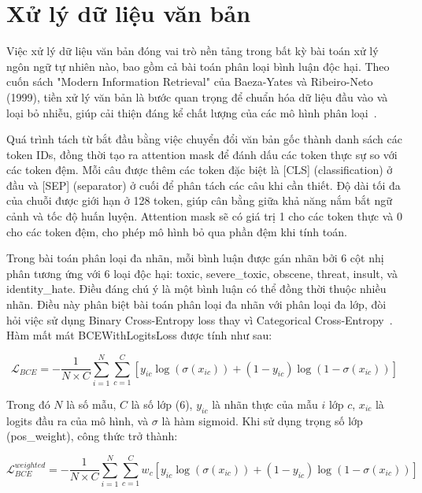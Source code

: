 \documentclass[../BTL.tex]{subfiles}
\begin{document}
\section{Xử lý dữ liệu văn bản}
Việc xử lý dữ liệu văn bản đóng vai trò nền tảng trong bất kỳ bài toán xử lý ngôn ngữ tự nhiên nào, bao gồm cả bài toán phân loại bình luận độc hại. Theo cuốn sách "Modern Information Retrieval" của Baeza-Yates và Ribeiro-Neto (1999), tiền xử lý văn bản là bước quan trọng để chuẩn hóa dữ liệu đầu vào và loại bỏ nhiễu, giúp cải thiện đáng kể chất lượng của các mô hình phân loại~\cite{baeza-yates1999modern}.

Quá trình tách từ bắt đầu bằng việc chuyển đổi văn bản gốc thành danh sách các token IDs, đồng thời tạo ra attention mask để đánh dấu các token thực sự so với các token đệm. Mỗi câu được thêm các token đặc biệt là [CLS] (classification) ở đầu và [SEP] (separator) ở cuối để phân tách các câu khi cần thiết. Độ dài tối đa của chuỗi được giới hạn ở 128 token, giúp cân bằng giữa khả năng nắm bắt ngữ cảnh và tốc độ huấn luyện. Attention mask sẽ có giá trị 1 cho các token thực và 0 cho các token đệm, cho phép mô hình bỏ qua phần đệm khi tính toán.

Trong bài toán phân loại đa nhãn, mỗi bình luận được gán nhãn bởi 6 cột nhị phân tương ứng với 6 loại độc hại: toxic, severe\_toxic, obscene, threat, insult, và identity\_hate. Điều đáng chú ý là một bình luận có thể đồng thời thuộc nhiều nhãn. Điều này phân biệt bài toán phân loại đa nhãn với phân loại đa lớp, đòi hỏi việc sử dụng Binary Cross-Entropy loss thay vì Categorical Cross-Entropy~\cite{goodfellow2016deep}. Hàm mất mát BCEWithLogitsLoss được tính như sau:

\begin{equation}
    \mathcal{L}_{BCE} = -\frac{1}{N \times C} \sum_{i=1}^{N} \sum_{c=1}^{C} \left[ y_{ic} \log(\sigma(x_{ic})) + (1 - y_{ic}) \log(1 - \sigma(x_{ic})) \right]
\end{equation}

Trong đó $N$ là số mẫu, $C$ là số lớp (6), $y_{ic}$ là nhãn thực của mẫu $i$ lớp $c$, $x_{ic}$ là logits đầu ra của mô hình, và $\sigma$ là hàm sigmoid. Khi sử dụng trọng số lớp (pos\_weight), công thức trở thành:

\begin{equation}
    \mathcal{L}_{BCE}^{weighted} = -\frac{1}{N \times C} \sum_{i=1}^{N} \sum_{c=1}^{C} w_c \left[ y_{ic} \log(\sigma(x_{ic})) + (1 - y_{ic}) \log(1 - \sigma(x_{ic})) \right]
\end{equation}
\end{document}
